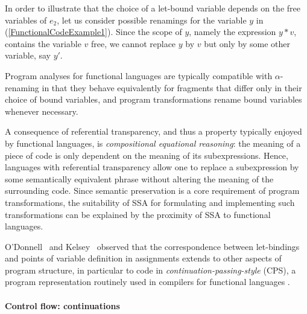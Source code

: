 In order to illustrate that the choice of a let-bound variable depends
on the free variables of $e_2$, let us consider possible renamings for
the variable $y$ in (\ref{FunctionalCodeExample1}). Since the scope of
$y$, namely the expression $y*v$, contains the variable $v$ free, we
cannot replace $y$ by $v$ but only by some other variable, say $y'$.

Program analyses for functional languages are typically compatible
with $\alpha$-renaming in that they behave equivalently for fragments
that differ only in their choice of bound variables, and program
transformations rename bound variables whenever necessary.

A consequence of referential transparency, and thus a property
typically enjoyed by functional languages, is \emph{compositional
equational reasoning}: the meaning of a piece of code is only
dependent on the meaning of its subexpressions. Hence, languages with
referential transparency allow one to replace a subexpression by some
semantically equivalent phrase without altering the meaning of the
surrounding code. Since semantic preservation is a core requirement of
program transformations, the suitability of SSA for formulating and
implementing such transformations can be explained by the proximity of
SSA to functional languages.

O'Donnell~\cite{ODonnellPhD} and Kelsey~\cite{Kelsey95} observed that
the correspondence between let-bindings and points of variable
definition in assignments extends to other aspects of program
structure, in particular to code in
\emph{continuation-passing-style} (CPS), a program
representation routinely used in compilers for functional languages
\cite{DBLP:journals/lisp/SussmanS98a,Appel:CWC}.

\paragraph{Control flow: continuations}

